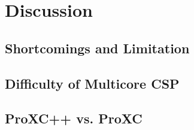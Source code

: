 

\chapter{Discussion}
\label{ch:discussion}

\section{Shortcomings and Limitation}


\section{Difficulty of Multicore CSP}


\section{ProXC++ vs. ProXC}


